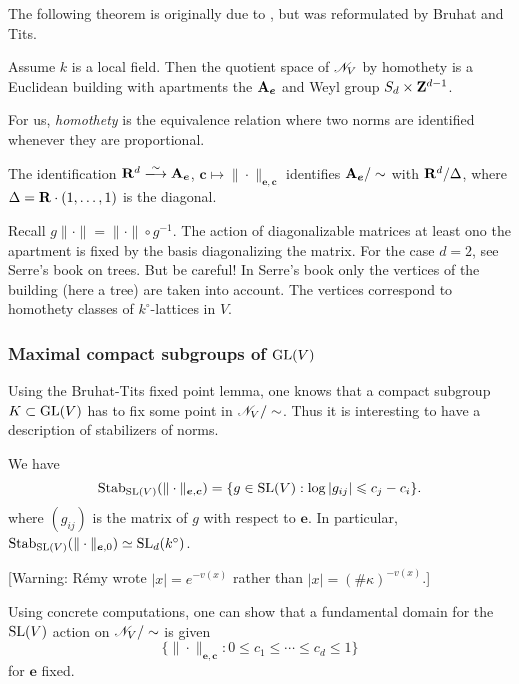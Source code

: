 The following theorem is originally due to \cite{gi63}, but was reformulated by 
Bruhat and Tits. 

\begin{theo}
Assume $k$ is a local field. Then 
the quotient space of $\mathscr{N}_V$ by homothety is a Euclidean building with 
apartments the $\mathbf{A}_{\boldsymbol e}$ and Weyl 
group $S_d\times \mathbf{Z}^{d-1}$. 
\end{theo}

For us, \emph{homothety} is the equivalence relation where two norms are identified 
whenever they are proportional. 

The identification $\dR^d\isomorphism \dA_{\boldsymbol e}$, 
$\boldsymbol c\mapsto \|\cdot\|_{\boldsymbol e,\boldsymbol c}$ identifies 
$\mathbf{A}_{\boldsymbol e}/\sim$ with $\mathbf{R}^d/\Delta$, where 
$\Delta=\mathbf{R}\cdot (1,\dots,1)$ is the diagonal. 

Recall $g \|\cdot\| = \|\cdot\|\circ g^{-1}$. The action of diagonalizable matrices at 
least ono the apartment is fixed by the basis diagonalizing the matrix. For the case 
$d=2$, see Serre's book on trees. But be careful! In Serre's book only the vertices 
of the building (here a tree) are taken into account. The vertices correspond 
to homothety classes of $k^\circ$-lattices in $V$. 


\subsubsection{Maximal compact subgroups of \texorpdfstring{$\operatorname{GL}(V)$}{GL(V)}}

Using the Bruhat-Tits fixed point lemma, one knows that a 
compact subgroup $K\subset \operatorname{GL}(V)$ has to fix some point in 
$\mathscr{N}_V/\sim$. Thus it is interesting to have a description of stabilizers of 
norms. 

\begin{prop}
We have 
\[
  \operatorname{Stab}_{\operatorname{SL}(V)}(\|\cdot\|_{\boldsymbol e,\boldsymbol c}) = \{g\in \operatorname{SL}(V): \log |g_{i j}| \leqslant c_j - c_i\} .
\]
where $(g_{i j})$ is the matrix of $g$ with respect to $\boldsymbol e$. 
In particular, $\operatorname{Stab}_{\operatorname{SL}(V)}(\|\cdot\|_{\boldsymbol e,0}) \simeq \operatorname{SL}_d(k^\circ)$. 
\end{prop}

[Warning: R\'emy wrote $|x|=e^{-v(x)}$ rather than 
$|x|=(\# \kappa)^{-v(x)}$.] 

Using concrete computations, one can show that a fundamental domain for the 
$\operatorname{SL}(V)$ action on $\mathscr{N}_V/\sim$ is given 
\[
  \{\|\cdot\|_{\boldsymbol e,\boldsymbol c}:0\leqslant c_1 \leqslant \cdots \leqslant c_d \leqslant 1\} 
\]
for $\boldsymbol e$ fixed. 

